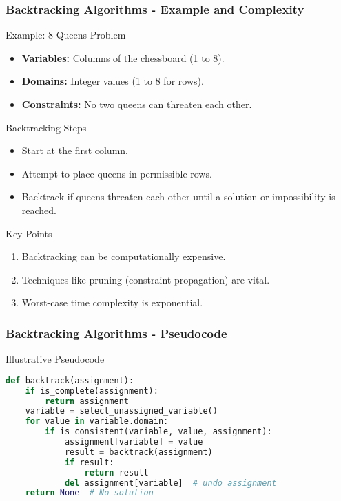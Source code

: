 \documentclass[aspectratio=169]{beamer}
\begin{document}
\begin{frame}[fragile]
    \frametitle{Backtracking Algorithms - Example and Complexity}
    \begin{block}{Example: 8-Queens Problem}
        \begin{itemize}
            \item \textbf{Variables:} Columns of the chessboard (1 to 8).
            \item \textbf{Domains:} Integer values (1 to 8 for rows).
            \item \textbf{Constraints:} No two queens can threaten each other.
        \end{itemize}
    \end{block}

    \begin{block}{Backtracking Steps}
        \begin{itemize}
            \item Start at the first column.
            \item Attempt to place queens in permissible rows.
            \item Backtrack if queens threaten each other until a solution or impossibility is reached.
        \end{itemize}
    \end{block}

    \begin{block}{Key Points}
        \begin{enumerate}
            \item Backtracking can be computationally expensive.
            \item Techniques like pruning (constraint propagation) are vital.
            \item Worst-case time complexity is exponential.
        \end{enumerate}
    \end{block}
\end{frame}

\begin{frame}[fragile]
    \frametitle{Backtracking Algorithms - Pseudocode}
    \begin{block}{Illustrative Pseudocode}
    \begin{lstlisting}[language=Python]
def backtrack(assignment):
    if is_complete(assignment):
        return assignment
    variable = select_unassigned_variable()
    for value in variable.domain:
        if is_consistent(variable, value, assignment):
            assignment[variable] = value
            result = backtrack(assignment)
            if result:
                return result
            del assignment[variable]  # undo assignment
    return None  # No solution
    \end{lstlisting}
    \end{block}
\end{frame}
\end{document}
